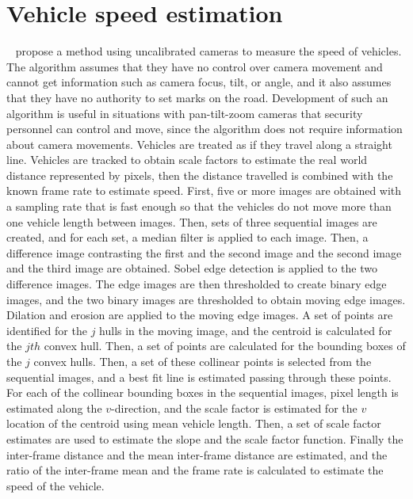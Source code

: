 \documentclass[a4paper]{aitthesis}
\begin{document}
\section{Vehicle speed estimation}
~ propose a method using uncalibrated cameras to measure the speed of vehicles. The algorithm assumes that they have no control over camera movement and cannot get information such as camera focus, tilt, or angle, and it also assumes that they have no authority to set marks on the road. Development of such an algorithm is useful in situations with pan-tilt-zoom cameras that security personnel can control and move, since the algorithm does not require information about camera movements. Vehicles are treated as if they travel along a straight line. Vehicles are tracked to obtain scale factors to estimate the real world distance represented by pixels, then the distance travelled is combined with the known frame rate to estimate speed. First, five or more images are obtained with a sampling rate that is fast enough so that the vehicles do not move more than one vehicle length between images. Then, sets of three sequential images are created, and for each set, a median filter is applied to each image. Then, a difference image contrasting the first and the second image and the second image and the third image are obtained. Sobel edge detection is applied to the two difference images. The edge images are then thresholded to create binary edge images, and the two binary images are thresholded to obtain moving edge images. Dilation and erosion are applied to the moving edge images. A set of points are identified for the $j$ hulls in the moving image, and the centroid is calculated for the $jth$ convex hull. Then, a set of points are calculated for the bounding boxes of the $j$ convex hulls. Then, a set of these collinear points is selected from the sequential images, and a best fit line is estimated passing through these points. For each of the collinear bounding boxes in the sequential images, pixel length is estimated along the $v$-direction, and the scale factor is estimated for the $v$ location of the centroid using mean vehicle length. Then, a set of scale factor estimates are used to estimate the slope and the scale factor function. Finally the inter-frame distance and the mean inter-frame distance are estimated, and the ratio of the inter-frame mean and the frame rate is calculated to estimate the speed of the vehicle. 
\end{document}
